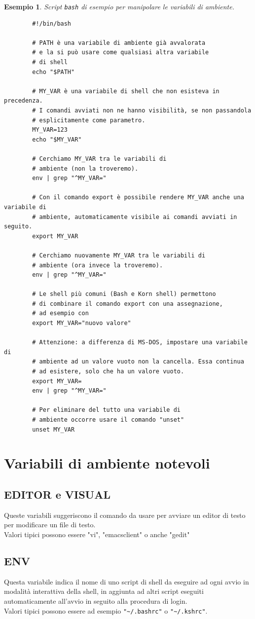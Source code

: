 \documentclass[11pt]{book}
\newtheorem{esempio}[section]{Esempio}
\begin{document}
\begin{esempio}
	Script \verb*|bash| di esempio per manipolare le variabili di ambiente.
	\begin{verbatim}
		#!/bin/bash
		
		# PATH è una variabile di ambiente già avvalorata
		# e la si può usare come qualsiasi altra variabile
		# di shell
		echo "$PATH"
		
		# MY_VAR è una variabile di shell che non esisteva in precedenza. 
		# I comandi avviati non ne hanno visibilità, se non passandola 
		# esplicitamente come parametro.
		MY_VAR=123
		echo "$MY_VAR"
		
		# Cerchiamo MY_VAR tra le variabili di 
		# ambiente (non la troveremo).
		env | grep "^MY_VAR="
		
		# Con il comando export è possibile rendere MY_VAR anche una variabile di
		# ambiente, automaticamente visibile ai comandi avviati in seguito. 
		export MY_VAR
		
		# Cerchiamo nuovamente MY_VAR tra le variabili di 
		# ambiente (ora invece la troveremo).
		env | grep "^MY_VAR="
		
		# Le shell più comuni (Bash e Korn shell) permettono
		# di combinare il comando export con una assegnazione,
		# ad esempio con
		export MY_VAR="nuovo valore"
		
		# Attenzione: a differenza di MS-DOS, impostare una variabile di
		# ambiente ad un valore vuoto non la cancella. Essa continua
		# ad esistere, solo che ha un valore vuoto.
		export MY_VAR=
		env | grep "^MY_VAR="
		
		# Per eliminare del tutto una variabile di
		# ambiente occorre usare il comando "unset"
		unset MY_VAR
	\end{verbatim}
\end{esempio}

\section{Variabili di ambiente notevoli}
\subsection{EDITOR e VISUAL}
Queste variabili suggeriscono il comando da usare per avviare un editor di testo per modificare un file di testo.\\
Valori tipici possono essere "vi", "emacsclient" o anche "gedit" 
\subsection{ENV}
Questa variabile indica il nome di uno script di shell da eseguire ad ogni avvio in modalità interattiva della shell, in aggiunta ad altri script eseguiti automaticamente all'avvio in seguito alla procedura di login.\\
Valori tipici possono essere ad esempio \verb*|"~/.bashrc"| o \verb*|"~/.kshrc"|. 
\end{document}
